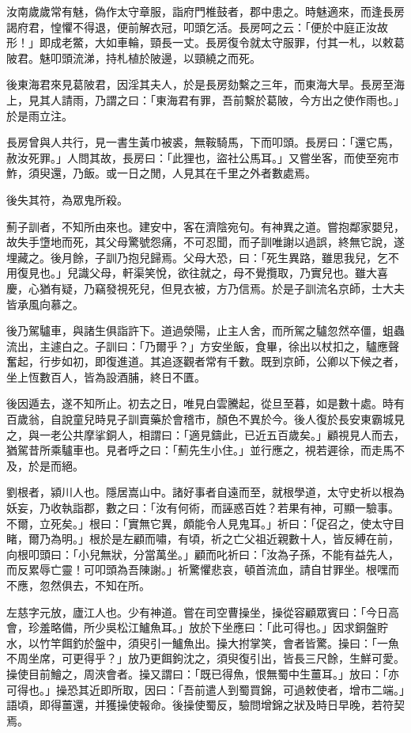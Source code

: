 \begin{pinyinscope}
汝南歲歲常有魅，偽作太守章服，詣府門椎鼓者，郡中患之。時魅適來，而逢長房謁府君，惶懼不得退，便前解衣冠，叩頭乞活。長房呵之云：「便於中庭正汝故形！」即成老鱉，大如車輪，頸長一丈。長房復令就太守服罪，付其一札，以敕葛陂君。魅叩頭流涕，持札植於陂邊，以頸繞之而死。

後東海君來見葛陂君，因淫其夫人，於是長房劾繫之三年，而東海大旱。長房至海上，見其人請雨，乃謂之曰：「東海君有罪，吾前繫於葛陂，今方出之使作雨也。」於是雨立注。

長房曾與人共行，見一書生黃巾被裘，無鞍騎馬，下而叩頭。長房曰：「還它馬，赦汝死罪。」人問其故，長房曰：「此狸也，盜社公馬耳。」又嘗坐客，而使至宛市鮓，須臾還，乃飯。或一日之閒，人見其在千里之外者數處焉。

後失其符，為眾鬼所殺。

薊子訓者，不知所由來也。建安中，客在濟陰宛句。有神異之道。嘗抱鄰家嬰兒，故失手墯地而死，其父母驚號怨痛，不可忍聞，而子訓唯謝以過誤，終無它說，遂埋藏之。後月餘，子訓乃抱兒歸焉。父母大恐，曰：「死生異路，雖思我兒，乞不用復見也。」兒識父母，軒渠笑悅，欲往就之，母不覺攬取，乃實兒也。雖大喜慶，心猶有疑，乃竊發視死兒，但見衣被，方乃信焉。於是子訓流名京師，士大夫皆承風向慕之。

後乃駕驢車，與諸生俱詣許下。道過滎陽，止主人舍，而所駕之驢忽然卒僵，蛆蟲流出，主遽白之。子訓曰：「乃爾乎？」方安坐飯，食畢，徐出以杖扣之，驢應聲奮起，行步如初，即復進道。其追逐觀者常有千數。既到京師，公卿以下候之者，坐上恆數百人，皆為設酒脯，終日不匱。

後因遁去，遂不知所止。初去之日，唯見白雲騰起，從旦至暮，如是數十處。時有百歲翁，自說童兒時見子訓賣藥於會稽市，顏色不異於今。後人復於長安東霸城見之，與一老公共摩挲銅人，相謂曰：「適見鑄此，已近五百歲矣。」顧視見人而去，猶駕昔所乘驢車也。見者呼之曰：「薊先生小住。」並行應之，視若遲徐，而走馬不及，於是而絕。

劉根者，潁川人也。隱居嵩山中。諸好事者自遠而至，就根學道，太守史祈以根為妖妄，乃收執詣郡，數之曰：「汝有何術，而誣惑百姓？若果有神，可顯一驗事。不爾，立死矣。」根曰：「實無它異，頗能令人見鬼耳。」祈曰：「促召之，使太守目睹，爾乃為明。」根於是左顧而嘯，有頃，祈之亡父祖近親數十人，皆反縛在前，向根叩頭曰：「小兒無狀，分當萬坐。」顧而叱祈曰：「汝為子孫，不能有益先人，而反累辱亡靈！可叩頭為吾陳謝。」祈驚懼悲哀，頓首流血，請自甘罪坐。根嘿而不應，忽然俱去，不知在所。

左慈字元放，廬江人也。少有神道。嘗在司空曹操坐，操從容顧眾賓曰：「今日高會，珍羞略備，所少吳松江鱸魚耳。」放於下坐應曰：「此可得也。」因求銅盤貯水，以竹竿餌釣於盤中，須臾引一鱸魚出。操大拊掌笑，會者皆驚。操曰：「一魚不周坐席，可更得乎？」放乃更餌鉤沈之，須臾復引出，皆長三尺餘，生鮮可愛。操使目前鱠之，周浹會者。操又謂曰：「既已得魚，恨無蜀中生薑耳。」放曰：「亦可得也。」操恐其近即所取，因曰：「吾前遣人到蜀買錦，可過敕使者，增市二端。」語頃，即得薑還，并獲操使報命。後操使蜀反，驗問增錦之狀及時日早晚，若符契焉。


\end{pinyinscope}

